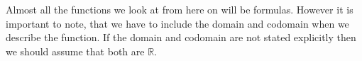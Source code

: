 Almost all the functions we look at from here on will be formulas. However it
is important to note, that we have to include the domain and codomain when we
describe the function. If the domain and codomain are not stated explicitly then
we should assume that both are $\mathbb{R}$.


\begin{comment}
\subsection*{Injections, Surjections and Inverses}
\textbf{I agree --- let us leave this until we review graphing functions, makes
discussions of inverses much easier.}

Given a function $f: A \to B$, that takes elements of $A$ and maps them to
elements of $B$, we might\footnote{Really there is no ``might'' about it, we
will ask this about lots of important functions we meet later in the text.} ask
--- is there another function $g: B \to A$ that undoes whatever it was that $f$
did to take things back to where we started.


\end{comment}
